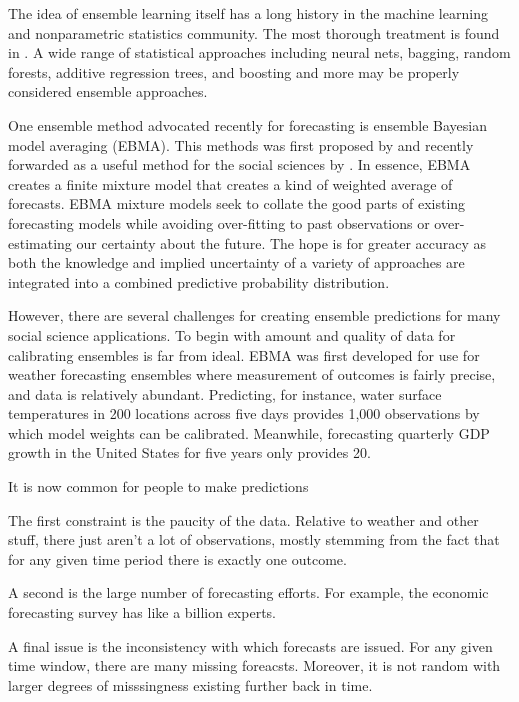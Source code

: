 \documentclass[12pt,fullpage,endnotes]{article}
\begin{document}
The idea of ensemble learning itself has a long history in the machine
learning and nonparametric statistics community. The most thorough
treatment is found in \citet{Hastie:2009}. A wide range of statistical
approaches including neural nets, bagging, random forests, additive
regression trees, and boosting and more may be properly considered
ensemble approaches.  

One ensemble method advocated recently for forecasting is ensemble
Bayesian model averaging (EBMA). This methods was first proposed by
\citet{Raftery:2005} and recently forwarded as a useful method for the
social sciences by \citet{Montgomery:2012a}. In essence, EBMA creates a
finite mixture model that creates a kind of weighted average of
forecasts.  EBMA mixture models seek to collate the good parts of
existing forecasting models while avoiding over-fitting to past
observations or over-estimating our certainty about the future.  The
hope is for greater accuracy as both the knowledge and implied
uncertainty of a variety of approaches are integrated into a combined
predictive probability distribution.

However, there are several challenges for creating ensemble
predictions for many social science applications.  To begin with
amount and quality of data for calibrating ensembles is far from
ideal.  EBMA was first developed for use for weather forecasting
ensembles where measurement of outcomes is fairly precise, and data is
relatively abundant.  Predicting, for instance, water surface
temperatures in 200 locations across five days provides 1,000
observations by which model weights can be calibrated.  Meanwhile, forecasting
quarterly GDP growth in the United States for five years only provides
20.

It is now common for people to make predictions





The first constraint is the paucity of the data.  Relative to weather
and other stuff, there just aren't a lot of observations, mostly
stemming from the fact that for any given time period there is exactly
one outcome.

A second is the large number of forecasting efforts.  For example, the
economic forecasting survey has like a billion experts.

A final issue is the inconsistency with which forecasts are
issued. For any given time window, there are many missing foreacsts.
Moreover, it is not random with larger degrees of misssingness
existing further back in time.
\end{document}
